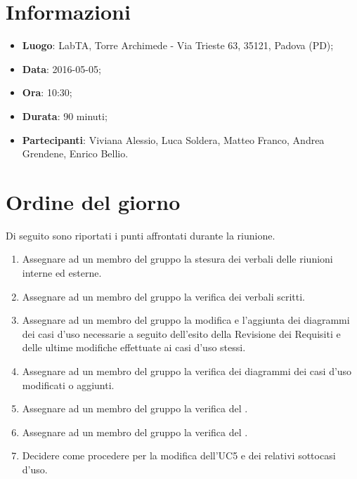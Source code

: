 \documentclass[a4paper,titlepage]{article}
\begin{document}
\maketitle

\begin{diario}
\end{diario}

\newpage
\tableofcontents

\newpage
\section{Informazioni}
\label{sec:Informazioni}

\begin{itemize}
 \item \textbf{Luogo}: LabTA, Torre Archimede - Via Trieste 63, 35121, Padova (PD);
 \item \textbf{Data}: 2016-05-05;
 \item \textbf{Ora}: 10:30;
 \item \textbf{Durata}: 90 minuti;
 \item \textbf{Partecipanti}: Viviana Alessio, Luca Soldera, Matteo Franco, Andrea Grendene, Enrico Bellio.
\end{itemize}

\section{Ordine del giorno}
\label{sec:Ordine del giorno}
Di seguito sono riportati i punti affrontati durante la riunione.

\begin{enumerate}
	\item Assegnare ad un membro del gruppo la stesura dei verbali delle riunioni interne ed esterne.
	\item Assegnare ad un membro del gruppo la verifica dei verbali scritti.
	\item Assegnare ad un membro del gruppo la modifica e l'aggiunta dei diagrammi dei casi d'uso necessarie a seguito dell'esito della Revisione dei Requisiti e delle ultime modifiche effettuate ai casi d'uso stessi.
	\item Assegnare ad un membro del gruppo la verifica dei diagrammi dei casi d'uso modificati o aggiunti.
	\item Assegnare ad un membro del gruppo la verifica del \PQdoc.
	\item Assegnare ad un membro del gruppo la verifica del \PPdoc.
	\item Decidere come procedere per la modifica dell'UC5 e dei relativi sottocasi d'uso.
\end{enumerate}
\end{document}
